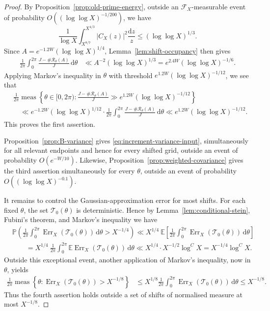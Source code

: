 \documentclass[a4paper,12pt,reqno]{amsart}
\numberwithin{equation}{section}
\theoremstyle{remark}
\newcommand{\E}{\mathbb{E}}
\newcommand{\p}{\mathbb{P}}
\begin{document}
\begin{proof}
By Proposition~\ref{prop:old-prime-energy}, outside an
\(\mathscr F_X\)-measurable event of probability
\(O((\log\log X)^{-1/200})\), we have
\[
 \frac1{\log X}\int_{X^{8/7}}^{X^{4/3}}
 |C_X(z)|^2\frac{\mathrm{d}z}{z}
 \leq(\log\log X)^{1/3}.
\]
Since \(A=e^{-1.2W}(\log\log X)^{1/4}\),
Lemma~\ref{lem:shift-occupancy} then gives
\[
 \begin{aligned}
 \frac1{2\pi}\int_0^{2\pi}
 \frac{J-\#\mathcal R_\theta(A)}{J}\,\mathrm{d}\theta
 &\ll
 A^{-2}(\log\log X)^{1/3}=
 e^{2.4W}(\log\log X)^{-1/6}.
 \end{aligned}
\]
Applying Markov's inequality in \(\theta\) with threshold
\(e^{1.2W}(\log\log X)^{-1/12}\), we see that
\[
 \begin{aligned}
 &\frac1{2\pi}\operatorname{meas}\left\{
 \theta\in[0,2\pi):
 \frac{J-\#\mathcal R_\theta(A)}{J}
 \gg
  e^{1.2W}(\log\log X)^{-1/12}
 \right\}\\
 &\quad \ll
{
 e^{-1.2W}(\log\log X)^{1/12}
 }
 \cdot
 \frac1{2\pi}\int_0^{2\pi}
 \frac{J-\#\mathcal R_\theta(A)}{J}\,\mathrm{d}\theta
 \ll
 e^{1.2W}(\log\log X)^{-1/12}.
 \end{aligned}
\]
This proves the first assertion.

Proposition~\ref{prop:B-variance} gives
\eqref{eq:increment-variance-input}, simultaneously for all relevant
endpoints and hence for every shifted grid, outside an event of probability
\(O(e^{-W/10})\). Likewise,
Proposition~\ref{prop:weighted-covariance} gives the third assertion
simultaneously for every \(\theta\), outside an event of probability
\(O((\log\log X)^{-0.1})\).

It remains to control the Gaussian-approximation error for most shifts.
For each fixed \(\theta\), the set \(\mathcal T_0(\theta)\) is deterministic.
Hence by Lemma~\ref{lem:conditional-stein}, Fubini's theorem, and Markov's
inequality we have
\[
 \begin{aligned}
&\p\left(
 \frac1{2\pi}\int_0^{2\pi}
 \operatorname{Err}_X(\mathcal T_0(\theta))\,\mathrm{d}\theta
 >X^{-1/4}
 \right)
 \ll 
 X^{1/4}\ \E\left[
 \frac1{2\pi}\int_0^{2\pi}
 \operatorname{Err}_X(\mathcal T_0(\theta))\,\mathrm{d}\theta
 \right]\\
 &\qquad=
 X^{1/4}\ \frac1{2\pi}\int_0^{2\pi}
 \E\operatorname{Err}_X(\mathcal T_0(\theta))\,\mathrm{d}\theta
 \ll 
 X^{1/4}\cdot X^{-1/2}\log^C X
 =
 X^{-1/4}\log^C X.
 \end{aligned}
\]
Outside this exceptional event, another application of Markov's inequality,
now in \(\theta\), yields
\[
 \begin{aligned}
 \frac1{2\pi}\operatorname{meas}\left\{
 \theta:
 \operatorname{Err}_X(\mathcal T_0(\theta))>X^{-1/8}
 \right\}
 &\leq
 X^{1/8}
 \frac1{2\pi}\int_0^{2\pi}
 \operatorname{Err}_X(\mathcal T_0(\theta))\,\mathrm{d}\theta\leq X^{-1/8}.
 \end{aligned}
\]
Thus the fourth assertion holds outside a set of shifts of normalised
measure at most \(X^{-1/8}\).


\end{proof}
\end{document}
